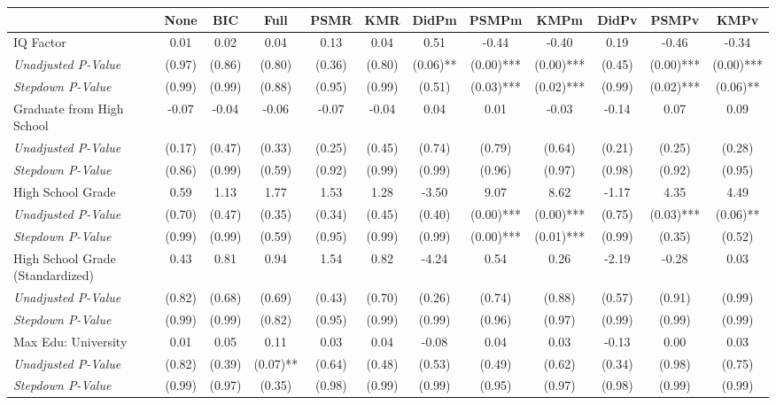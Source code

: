 \begin{tabular}{l c c c c c c c c c c c}
\toprule
 & None & BIC & Full & PSMR & KMR & DidPm & PSMPm & KMPm & DidPv & PSMPv & KMPv \\
\midrule
IQ Factor & 0.01 & 0.02 & 0.04 & 0.13 & 0.04 & 0.51 & -0.44 & -0.40 & 0.19 & -0.46 & -0.34 \\
\quad \textit{Unadjusted P-Value} & (0.97) & (0.86) & (0.80) & (0.36) & (0.80) & (0.06)** & (0.00)*** & (0.00)*** & (0.45) & (0.00)*** & (0.00)*** \\
\quad \textit{Stepdown P-Value} & (0.99) & (0.99) & (0.88) & (0.95) & (0.99) & (0.51) & (0.03)*** & (0.02)*** & (0.99) & (0.02)*** & (0.06)** \\
Graduate from High School & -0.07 & -0.04 & -0.06 & -0.07 & -0.04 & 0.04 & 0.01 & -0.03 & -0.14 & 0.07 & 0.09 \\
\quad \textit{Unadjusted P-Value} & (0.17) & (0.47) & (0.33) & (0.25) & (0.45) & (0.74) & (0.79) & (0.64) & (0.21) & (0.25) & (0.28) \\
\quad \textit{Stepdown P-Value} & (0.86) & (0.99) & (0.59) & (0.92) & (0.99) & (0.99) & (0.96) & (0.97) & (0.98) & (0.92) & (0.95) \\
High School Grade & 0.59 & 1.13 & 1.77 & 1.53 & 1.28 & -3.50 & 9.07 & 8.62 & -1.17 & 4.35 & 4.49 \\
\quad \textit{Unadjusted P-Value} & (0.70) & (0.47) & (0.35) & (0.34) & (0.45) & (0.40) & (0.00)*** & (0.00)*** & (0.75) & (0.03)*** & (0.06)** \\
\quad \textit{Stepdown P-Value} & (0.99) & (0.99) & (0.59) & (0.95) & (0.99) & (0.99) & (0.00)*** & (0.01)*** & (0.99) & (0.35) & (0.52) \\
High School Grade (Standardized) & 0.43 & 0.81 & 0.94 & 1.54 & 0.82 & -4.24 & 0.54 & 0.26 & -2.19 & -0.28 & 0.03 \\
\quad \textit{Unadjusted P-Value} & (0.82) & (0.68) & (0.69) & (0.43) & (0.70) & (0.26) & (0.74) & (0.88) & (0.57) & (0.91) & (0.99) \\
\quad \textit{Stepdown P-Value} & (0.99) & (0.99) & (0.82) & (0.95) & (0.99) & (0.99) & (0.96) & (0.97) & (0.99) & (0.99) & (0.99) \\
Max Edu: University & 0.01 & 0.05 & 0.11 & 0.03 & 0.04 & -0.08 & 0.04 & 0.03 & -0.13 & 0.00 & 0.03 \\
\quad \textit{Unadjusted P-Value} & (0.82) & (0.39) & (0.07)** & (0.64) & (0.48) & (0.53) & (0.49) & (0.62) & (0.34) & (0.98) & (0.75) \\
\quad \textit{Stepdown P-Value} & (0.99) & (0.97) & (0.35) & (0.98) & (0.99) & (0.99) & (0.95) & (0.97) & (0.98) & (0.99) & (0.99) \\

\end{tabular}
